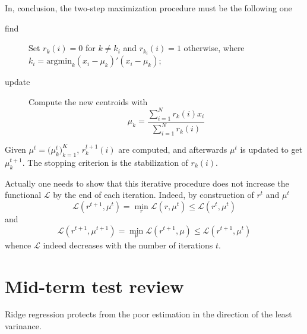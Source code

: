 \documentclass[a4paper]{article}
\newcommand{\Lcal}{\mathcal{L}}
\begin{document}
In, conclusion, the two-step maximization procedure must be the following one \begin{description}
	\item[find] Set $r_k(i)=0$ for $k\neq k_i$ and $r_{k_i}(i)=1$ otherwise, where
	$k_i = \text{argmin}_k (x_i-\mu_k)'(x_i-\mu_k)$;
	\item[update] Compute the new centroids with
	\[\mu_k = \frac{\sum_{i=1}^N r_k(i) x_i}{\sum_{i=1}^N r_k(i)}\]
\end{description}
Given $\mu^t = \bigl(\mu_k^t\bigr)_{k=1}^K$, $r_k^{t+1}(i)$ are computed,
and afterwards $\mu^t$ is updated to get $\mu_k^{t+1}$. The stopping criterion
is the stabilization of $r_k(i)$.

Actually one needs to show that this iterative procedure does not increase
the functional $\Lcal$ by the end of each iteration. Indeed, by construction
of $r^t$ and $\mu^t$
\[\Lcal(r^{t+1}, \mu^t) = \min_r \Lcal(r, \mu^t) \leq \Lcal(r^t, \mu^t)\]
and
\[\Lcal(r^{t+1}, \mu^{t+1}) = \min_\mu \Lcal(r^{t+1}, \mu) \leq \Lcal(r^{t+1}, \mu^t)\]
whence $\Lcal$ indeed decreases with the number of iterations $t$.




\section{Mid-term test review} %
\label{sec:mid_term_test_review}
Ridge regression protects from the poor estimation in the direction of the least varinance.
\end{document}
